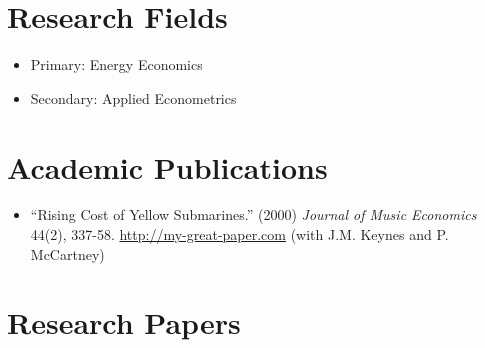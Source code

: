 \documentclass{article}[12]
\begin{document}
\section{Research Fields}

\begin{itemize}
    \item Primary: Energy Economics
    \item Secondary: Applied Econometrics
\end{itemize}


\section{Academic Publications}

\begin{itemize}
    \item ``Rising Cost of Yellow Submarines.'' (2000) \emph{Journal of Music Economics} 44(2), 337-58. \url{http://my-great-paper.com} (with J.M. Keynes and P. McCartney)
\end{itemize}

\section{Research Papers}
\end{document}
